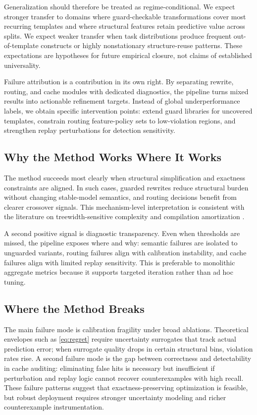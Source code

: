 \documentclass{article} %
\begin{document}
Generalization should therefore be treated as regime-conditional. We expect stronger transfer to domains where guard-checkable transformations cover most recurring templates and where structural features retain predictive value across splits. We expect weaker transfer when task distributions produce frequent out-of-template constructs or highly nonstationary structure-reuse patterns. These expectations are hypotheses for future empirical closure, not claims of established universality.

Failure attribution is a contribution in its own right. By separating rewrite, routing, and cache modules with dedicated diagnostics, the pipeline turns mixed results into actionable refinement targets. Instead of global underperformance labels, we obtain specific intervention points: extend guard libraries for uncovered templates, constrain routing feature-policy sets to low-violation regions, and strengthen replay perturbations for detection sensitivity.

\subsection{Why the Method Works Where It Works}
The method succeeds most clearly when structural simplification and exactness constraints are aligned. In such cases, guarded rewrites reduce structural burden without changing stable-model semantics, and routing decisions benefit from clearer crossover signals. This mechanism-level interpretation is consistent with the literature on treewidth-sensitive complexity and compilation amortization \citep{src_001,src_002,src_003,src_039,src_045,src_048}.

A second positive signal is diagnostic transparency. Even when thresholds are missed, the pipeline exposes where and why: semantic failures are isolated to unguarded variants, routing failures align with calibration instability, and cache failures align with limited replay sensitivity. This is preferable to monolithic aggregate metrics because it supports targeted iteration rather than ad hoc tuning.

\subsection{Where the Method Breaks}
The main failure mode is calibration fragility under broad ablations. Theoretical envelopes such as \eqref{eq:regret} require uncertainty surrogates that track actual prediction error; when surrogate quality drops in certain structural bins, violation rates rise. A second failure mode is the gap between correctness and detectability in cache auditing: eliminating false hits is necessary but insufficient if perturbation and replay logic cannot recover counterexamples with high recall. These failure patterns suggest that exactness-preserving optimization is feasible, but robust deployment requires stronger uncertainty modeling and richer counterexample instrumentation.
\end{document}
